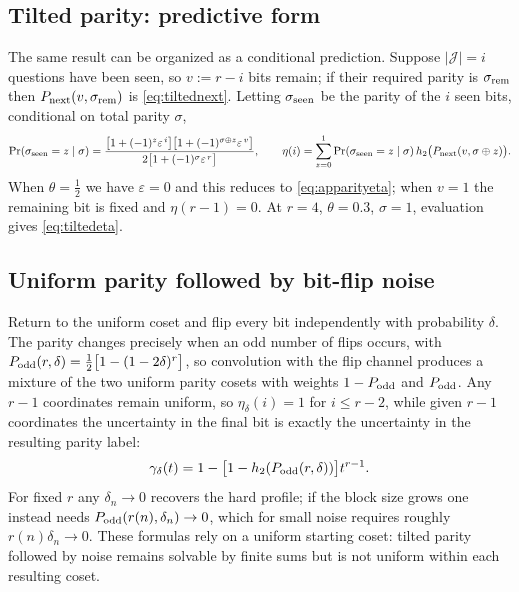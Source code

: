 \subsection{Tilted parity: predictive form}

The same result can be organized as a conditional prediction. Suppose
$|\mathcal J| = i$ questions have been seen, so $v := r-i$ bits
remain; if their required parity is $\sigma_{\rm rem}$ then
$P_{\rm next}(v,\sigma_{\rm rem})$ is \eqref{eq:tiltednext}. Letting
$\sigma_{\rm seen}$ be the parity of the $i$ seen bits, conditional
on total parity $\sigma$,
%
\begin{equation}
  \Pr(\sigma_{\rm seen} = z\mid\sigma)
  = \frac{\big[1+(-1)^z\varepsilon^{\,i}\big]
    \big[1+(-1)^{\sigma\oplus z}\varepsilon^{\,v}\big]}
    {2\big[1+(-1)^\sigma\varepsilon^{\,r}\big]},
  \qquad
  \eta(i) = \sum_{z=0}^1\Pr(\sigma_{\rm seen} = z\mid\sigma)\,
  h_2\big(P_{\rm next}(v,\sigma\oplus z)\big). 
  \label{eq:apptiltedeta}
\end{equation}
%
When $\theta = \tfrac12$ we have $\varepsilon = 0$ and this reduces
to \eqref{eq:apparityeta}; when $v = 1$ the remaining bit is fixed and
$\eta(r-1) = 0$. At $r = 4$, $\theta = 0.3$, $\sigma = 1$, evaluation
gives \eqref{eq:tiltedeta}.

\subsection{Uniform parity followed by bit-flip noise}

Return to the uniform coset and flip every bit independently with
probability $\delta$. The parity changes precisely when an odd number
of flips occurs, with
$P_{\rm odd}(r,\delta) = \tfrac12\big[1-(1-2\delta)^r\big]$, so
convolution with the flip channel produces a mixture of the two
uniform parity cosets with weights $1-P_{\rm odd}$ and
$P_{\rm odd}$. Any $r-1$ coordinates remain uniform, so
$\eta_\delta(i) = 1$ for $i\le r-2$, while given $r-1$ coordinates
the uncertainty in the final bit is exactly the uncertainty in the
resulting parity label:
%
\begin{equation}
  \gamma_\delta(t)
  = 1-\big[1-h_2(P_{\rm odd}(r,\delta))\big]t^{r-1}. 
  \label{eq:appnoisyparity}
\end{equation}
%
For fixed $r$ any $\delta_n\to0$ recovers the hard profile; if the
block size grows one instead needs
$P_{\rm odd}(r(n),\delta_n)\to0$, which for small noise requires
roughly $r(n)\delta_n\to0$. These formulas rely on a uniform starting
coset: tilted parity followed by noise remains solvable by finite
sums but is not uniform within each resulting coset.

